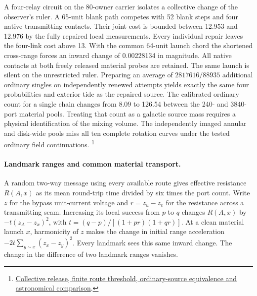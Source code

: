 \documentclass[11pt]{article}
\begin{document}
A four-relay circuit on the 80-owner carrier isolates a collective
change of the observer's ruler. A 65-unit blank path competes with 52
blank steps and four native transmitting contacts. Their joint cost
is bounded between 12.953 and 12.976 by the fully repaired local
measurements. Every individual repair leaves the four-link cost above
13. With the common 64-unit launch chord the shortened cross-range
forces an inward change of 0.00228134 in magnitude. All native
contacts at both freely released material probes are retained. The
same launch is silent on the unrestricted ruler. Preparing an average
of \(2817616/88935\) additional ordinary singles on independently renewed
attempts yields exactly the same four probabilities and exterior tide
as the repaired source. The calibrated ordinary count for a single
chain changes from 8.09 to 126.54 between the 240- and 3840-port
material pools. Treating that count as a galactic source mass requires
a physical identification of the mixing volume. The independently
imaged annular and disk-wide pools miss all ten complete rotation
curves under the tested ordinary field continuations.%
\footnote{\href{https://github.com/FloatingPragma/observer-patch-holography/blob/main/model/experiments/interval_echo_shell_flux/product_address/green_response/material_recoil/overlap_source/native_boundary/stock/aperture/COLLECTIVE_RESULTS.md}{Collective release, finite route threshold, ordinary-source equivalence and astronomical comparison}.}

\paragraph{Landmark ranges and common material transport.}
A random two-way message using every available route gives effective
resistance \(R(A,x)\) as its mean round-trip time divided by six times
the port count. Write \(z\) for the bypass unit-current voltage and
\(r=z_u-z_v\) for the resistance across a transmitting seam. Increasing
its local success from \(p\) to \(q\) changes \(R(A,x)\) by
\(-t(z_A-z_x)^2\), with \(t=(q-p)/[(1+pr)(1+qr)]\).
At a clean material launch \(x\), harmonicity of \(z\) makes the
change in initial range acceleration
\(-2t\sum_{y\sim x}(z_x-z_y)^2\). Every landmark sees this same inward
change. The change in the difference of two landmark ranges vanishes.
\end{document}
